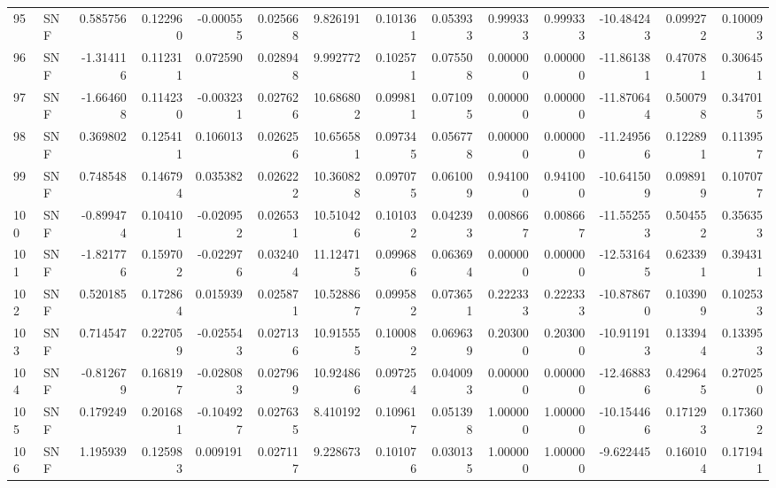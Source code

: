 \begin{tabular}{llrrrrrrrrrrrr}
95  &    SNF &  0.585756 &      0.122960 & -0.000555 &    0.025668 &   9.826191 &      0.101361 &   0.053933 &  0.999333 &  0.999333 & -10.484243 &     0.099272 &     0.100093 \\
96  &    SNF & -1.314116 &      0.112311 &  0.072590 &    0.028948 &   9.992772 &      0.102571 &   0.075508 &  0.000000 &  0.000000 & -11.861381 &     0.470781 &     0.306451 \\
97  &    SNF & -1.664608 &      0.114230 & -0.003231 &    0.027626 &  10.686802 &      0.099811 &   0.071095 &  0.000000 &  0.000000 & -11.870644 &     0.500798 &     0.347015 \\
98  &    SNF &  0.369802 &      0.125411 &  0.106013 &    0.026256 &  10.656581 &      0.097345 &   0.056778 &  0.000000 &  0.000000 & -11.249566 &     0.122891 &     0.113957 \\
99  &    SNF &  0.748548 &      0.146794 &  0.035382 &    0.026222 &  10.360828 &      0.097075 &   0.061009 &  0.941000 &  0.941000 & -10.641509 &     0.098919 &     0.107077 \\
100 &    SNF & -0.899474 &      0.104101 & -0.020952 &    0.026531 &  10.510426 &      0.101032 &   0.042393 &  0.008667 &  0.008667 & -11.552553 &     0.504552 &     0.356353 \\
101 &    SNF & -1.821776 &      0.159702 & -0.022976 &    0.032404 &  11.124715 &      0.099686 &   0.063694 &  0.000000 &  0.000000 & -12.531645 &     0.623391 &     0.394311 \\
102 &    SNF &  0.520185 &      0.172864 &  0.015939 &    0.025871 &  10.528867 &      0.099582 &   0.073651 &  0.222333 &  0.222333 & -10.878670 &     0.103909 &     0.102533 \\
103 &    SNF &  0.714547 &      0.227059 & -0.025543 &    0.027136 &  10.915555 &      0.100082 &   0.069639 &  0.203000 &  0.203000 & -10.911913 &     0.133944 &     0.133953 \\
104 &    SNF & -0.812679 &      0.168197 & -0.028083 &    0.027969 &  10.924866 &      0.097254 &   0.040093 &  0.000000 &  0.000000 & -12.468836 &     0.429645 &     0.270250 \\
105 &    SNF &  0.179249 &      0.201681 & -0.104927 &    0.027635 &   8.410192 &      0.109617 &   0.051398 &  1.000000 &  1.000000 & -10.154466 &     0.171293 &     0.173602 \\
106 &    SNF &  1.195939 &      0.125983 &  0.009191 &    0.027117 &   9.228673 &      0.101076 &   0.030135 &  1.000000 &  1.000000 &  -9.622445 &     0.160104 &     0.171941 \\

\end{tabular}
